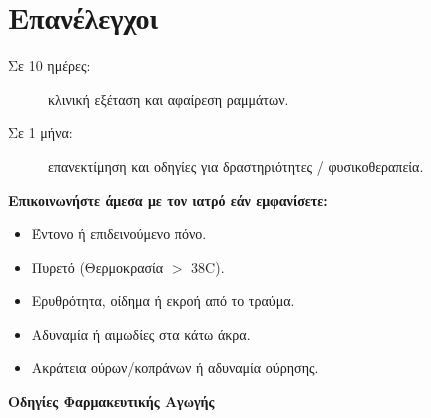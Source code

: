 \documentclass[10pt,greek]{article}
\begin{document}
\section*{Επανέλεγχοι}
\begin{description}
\item[Σε 10 ημέρες:] κλινική εξέταση και αφαίρεση ραμμάτων.
\item[Σε 1 μήνα:] επανεκτίμηση και οδηγίες για δραστηριότητες / φυσικοθεραπεία.
\end{description}


\textbf{Επικοινωνήστε άμεσα με τον ιατρό εάν εμφανίσετε:}
\begin{itemize}
\item Έντονο ή επιδεινούμενο πόνο.
\item Πυρετό (Θερμοκρασία $>$ 38\textdegree{}C).
\item Ερυθρότητα, οίδημα ή εκροή από το τραύμα.
\item Αδυναμία ή αιμωδίες στα κάτω άκρα.
\item Ακράτεια ούρων/κοπράνων ή αδυναμία ούρησης.
\end{itemize}

\newpage
\begin{center}
\LARGE\textbf{Οδηγίες Φαρμακευτικής Αγωγής}
\end{center}
\vspace{0.5cm}
\end{document}
